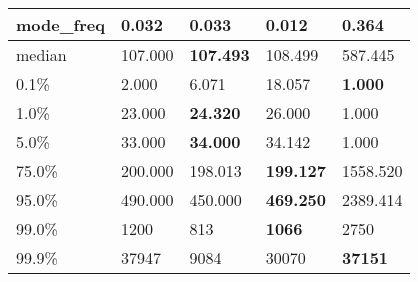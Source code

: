 \begin{table}[H]
\begin{tabular}{|l|m{10em}|m{10em}|m{10em}|m{10em}|}
\hline mode\_freq & 0.032 & \bfseries 0.033 & 0.012 & \cellcolor[rgb]{0.9, 0.54, 0.52} 0.364 \\
\hline median & 107.000 & \bfseries 107.493 & 108.499 & \cellcolor[rgb]{0.9, 0.54, 0.52} 587.445 \\
\hline 0.1\% & 2.000 & 6.071 & \cellcolor[rgb]{0.9, 0.54, 0.52} 18.057 & \bfseries 1.000 \\
\hline 1.0\% & 23.000 & \bfseries 24.320 & 26.000 & \cellcolor[rgb]{0.9, 0.54, 0.52} 1.000 \\
\hline 5.0\% & 33.000 & \bfseries 34.000 & 34.142 & \cellcolor[rgb]{0.9, 0.54, 0.52} 1.000 \\
\hline 75.0\% & 200.000 & 198.013 & \bfseries 199.127 & \cellcolor[rgb]{0.9, 0.54, 0.52} 1558.520 \\
\hline 95.0\% & 490.000 & 450.000 & \bfseries 469.250 & \cellcolor[rgb]{0.9, 0.54, 0.52} 2389.414 \\
\hline 99.0\% & 1200 & 813 & \bfseries 1066 & \cellcolor[rgb]{0.9, 0.54, 0.52} 2750 \\
\hline 99.9\% & 37947 & \cellcolor[rgb]{0.9, 0.54, 0.52} 9084 & 30070 & \bfseries 37151 \\
\hline
\end{tabular}
\end{table}
